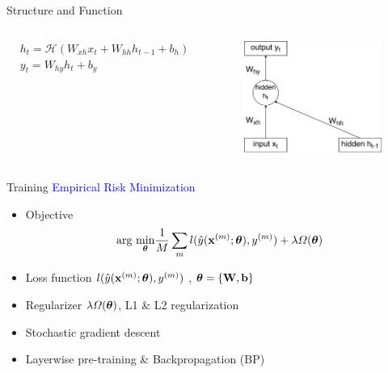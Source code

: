 \begin{frame}[t]{Structure and Function}
	\begin{columns}
	 \column{2in}
	 \begin{align}
				&h_{t} = \mathcal{H}(W_{xh}x_{t}+W_{hh}h_{t-1} + b_{h})\nonumber\\
				&y_{t} = W_{hy}h_{t} + b_{y}\nonumber
			\end{align}
	  \begin{figure}
	  \includegraphics[width=\textwidth]{RNNunit.png}
	  \end{figure}
	 
	\end{columns}
\end{frame}
  
	\begin{frame}[t]{Training}
		\textcolor{blue}{\Large Empirical Risk Minimization}
		\begin{itemize}
		 \item Objective
		 \begin{eqnarray}
			\text{arg}~\underset{\boldsymbol{\theta}}{\mathrm{min}} \frac{1}{M}\sum_m l(\hat{y}(\mathbf{x}^{(m)};\boldsymbol{\theta}),y^{(m)}) + \lambda \Omega(\boldsymbol{\theta})\nonumber
			\end{eqnarray}
		 \item Loss function $l(\hat{y}(\mathbf{x}^{(m)};\boldsymbol{\theta}),y^{(m)})$ , $\boldsymbol{\theta} = \{\mathbf{W},\mathbf{b}\}$
		 \item Regularizer $\lambda \Omega(\boldsymbol{\theta})$, L1 \& L2 regularization
		\end{itemize}
		\vspace{5mm}
		\begin{itemize}
		 \item Stochastic gradient descent
		 \item Layerwise pre-training \& Backpropagation (BP)
		\end{itemize}

		
		
	\end{frame}
	
